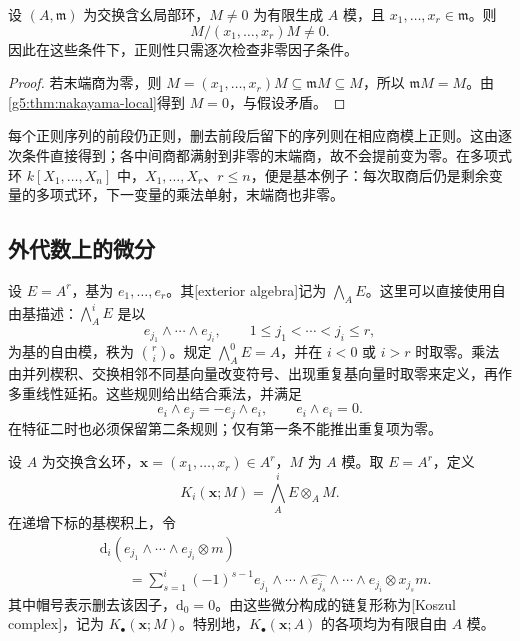 \begin{proposition}\label{g5:prop:regular-sequence-terminal-quotient}
	设 \((A,\mathfrak m)\) 为交换含幺局部环，\(M\ne0\) 为有限生成 \(A\) 模，且 \(x_1,\ldots,x_r\in\mathfrak m\)。则
	\[
		M/(x_1,\ldots,x_r)M\ne0.
	\]
	因此在这些条件下，正则性只需逐次检查非零因子条件。
\end{proposition}
\begin{proof}
	若末端商为零，则
	\(M=(x_1,\ldots,x_r)M\subseteq\mathfrak mM\subseteq M\)，所以 \(\mathfrak mM=M\)。由\cref{g5:thm:nakayama-local}得到 \(M=0\)，与假设矛盾。
\end{proof}

每个正则序列的前段仍正则，删去前段后留下的序列则在相应商模上正则。这由逐次条件直接得到；各中间商都满射到非零的末端商，故不会提前变为零。在多项式环 \(k[X_1,\ldots,X_n]\) 中，\(X_1,\ldots,X_r\)、\(r\leq n\)，便是基本例子：每次取商后仍是剩余变量的多项式环，下一变量的乘法单射，末端商也非零。

\subsection{外代数上的微分}
\label{g5:subsec:0802:02}

设 \(E=A^r\)，基为 \(e_1,\ldots,e_r\)。其[exterior algebra]记为 \(\bigwedge_A E\)。这里可以直接使用自由基描述：\(\bigwedge_A^iE\) 是以
\[
	e_{j_1}\wedge\cdots\wedge e_{j_i},
	\qquad 1\leq j_1<\cdots<j_i\leq r,
\]
为基的自由模，秩为 \(\binom ri\)。规定 \(\bigwedge_A^0E=A\)，并在 \(i<0\) 或 \(i>r\) 时取零。乘法由并列楔积、交换相邻不同基向量改变符号、出现重复基向量时取零来定义，再作多重线性延拓。这些规则给出结合乘法，并满足
\[
	e_i\wedge e_j=-e_j\wedge e_i,
	\qquad e_i\wedge e_i=0.
\]
在特征二时也必须保留第二条规则；仅有第一条不能推出重复项为零。

\begin{definition}\label{g5:def:koszul-complex}
	设 \(A\) 为交换含幺环，\(\mathbf x=(x_1,\ldots,x_r)\in A^r\)，\(M\) 为 \(A\) 模。取 \(E=A^r\)，定义
	\[
		K_i(\mathbf x;M)=\bigwedge_A^iE\otimes_A M.
	\]
	在递增下标的基楔积上，令
	\begin{equation}\label{g5:eq:koszul-differential}
		\begin{aligned}
		&\mathrm d_i(e_{j_1}\wedge\cdots\wedge e_{j_i}\otimes m)\\
		&\qquad=\sum_{s=1}^i(-1)^{s-1}
		 e_{j_1}\wedge\cdots\wedge\widehat{e_{j_s}}
		 \wedge\cdots\wedge e_{j_i}\otimes x_{j_s}m.
		\end{aligned}
	\end{equation}
	其中帽号表示删去该因子，\(\mathrm d_0=0\)。由这些微分构成的链复形称为[Koszul complex]，记为 \(K_\bullet(\mathbf x;M)\)。特别地，\(K_\bullet(\mathbf x;A)\) 的各项均为有限自由 \(A\) 模。
\end{definition}

